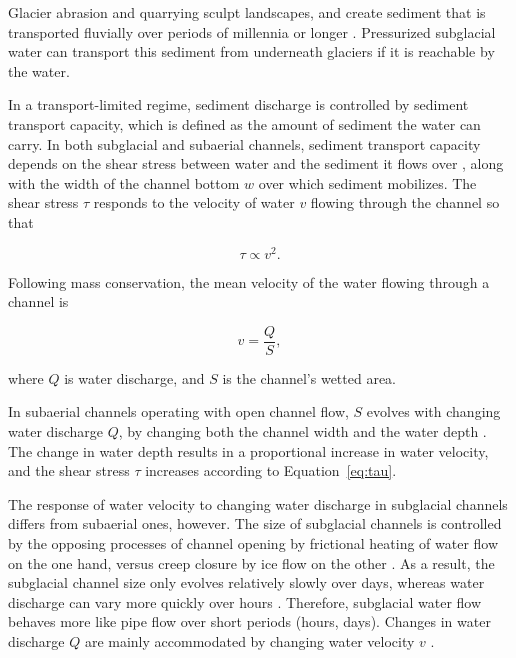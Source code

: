 \documentclass[tc, manuscript]{copernicus}
\begin{document}
Glacier abrasion and quarrying sculpt landscapes, and create sediment that is transported fluvially over periods of millennia or longer \citep[c.f.][]{hallet1979,iverson2012,ugelvig2018}.
Pressurized subglacial water can transport this sediment from underneath glaciers \citep{walder1994,creyts2013,beaud2018,delaney2019} if it is reachable by the water.

In a transport-limited regime, sediment discharge is controlled by sediment transport capacity, which is defined as the amount of sediment the water can carry.
In both subglacial and subaerial channels, sediment transport capacity depends on the shear stress between water and the sediment it flows over \citep{shields1936,meyer1948,engelund1967}, along with the width of the channel bottom $w$ over which sediment mobilizes.
The shear stress $\tau$ responds to the velocity of water $v$ flowing through the channel so that
\begin{linenomath*}
  \begin{equation}
    \label{eq:tau}
    \tau \propto v^2.
  \end{equation}
\end{linenomath*}
% 
Following mass conservation, the mean velocity of the water flowing through a  channel is
\begin{linenomath*}
  \begin{equation}
    \label{eq:v}
    v = \frac{Q}{S},
  \end{equation}
\end{linenomath*}
where $Q$ is water discharge,  and $S$ is the channel's wetted area. 

In subaerial channels operating with open channel flow, $S$  evolves with changing water discharge $Q$, by changing both the channel width and the water depth \citep{leopold1953}.
The change in water depth results in a proportional increase in water velocity, and the shear stress $\tau$ increases according to Equation~\ref{eq:tau}.

The response of water velocity to changing water discharge in subglacial channels differs from subaerial ones, however.
The size of subglacial channels is controlled by the opposing processes of channel opening by frictional heating of water flow on the one hand, versus creep closure by ice flow on the other \citep{rothlisberger1972}.
As a result, the subglacial channel size only evolves relatively slowly over days, whereas water discharge can vary more quickly over hours \citep[e.g.][]{iken1986,andrews2014,nanni2020}.
Therefore, subglacial water flow behaves more like pipe flow over short periods (hours, days).
Changes in water discharge $Q$ are mainly accommodated by changing water velocity $v$ \citep[Equation~\ref{eq:v} and Figure~\ref{fig:cartoon}; ][]{alley1997}.
\end{document}
